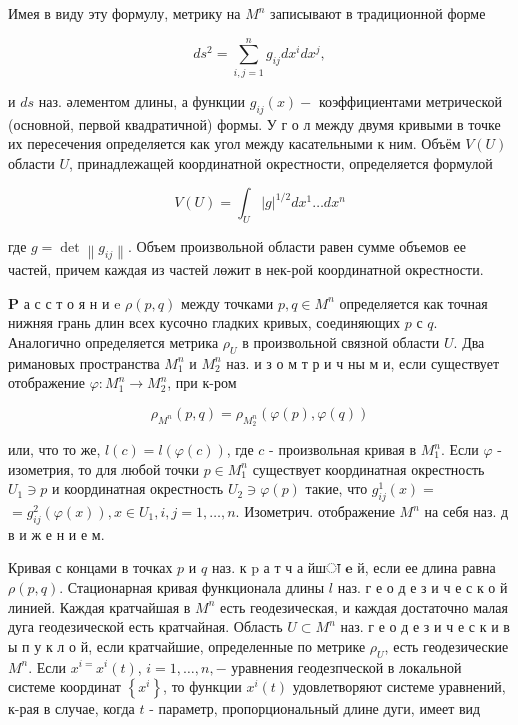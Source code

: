 \documentclass[10pt]{article}
\begin{document}
Имея в виду эту формулу, метрику на $M^{n}$ записывают в традиционной форме



\[

d s^{2}=\sum_{i, j=1}^{n} g_{i j} d x^{i} d x^{j},

\]



и $d s$ наз. әлементом длины, а функции $g_{i j}(x)-$ коэффициентами метрической (основной, первой квадратичной) формы. У г о л между двумя кривыми в точке их пересечения определяется как угол между касательными к ним. Объём $V(U)$ области $U$, принадлежащей координатной окрестности, определяется формулой



\[

V(U)=\int_{U}|g|^{1 / 2} d x^{1} \ldots d x^{n}

\]



где $g=\operatorname{det}\left\|g_{i j}\right\|$. Объем произвольной области равен сумме объемов ее частей, причем каждая из частей лөжит в нек-рой координатной окрестности.



$\mathbf{P}$ а с с т о я н и e $\rho(p, q)$ между точками $p, q \in M^{n}$ определяется как точная нижняя грань длин всех кусочно гладких кривых, соединяющих $p$ с $q$. Аналогично определяется метрика $\rho_{U}$ в произвольной связной области $U$. Два римановых пространства $M_{1}^{n}$ и $M_{2}^{n}$ наз. и з о м т р и ч ны м и, если существует отображение $\varphi: M_{1}^{n} \rightarrow M_{2}^{n}$, при к-ром



\[

\rho_{M^{n}}(p, q)=\rho_{M_{2}^{n}}(\varphi(p), \varphi(q))

\]



или, что то же, $l(c)=l(\varphi(c))$, где $c$ - произвольная кривая в $M_{1}^{n}$. Если $\varphi$ - изометрия, то для любой точки $p \in M_{1}^{n}$ существует координатная окрестность $U_{1} \ni p$ и координатная окрестность $U_{2} \ni \varphi(p)$ такие, что $g_{i j}^{1}(x)=$ $=g_{i j}^{2}(\varphi(x)), x \in U_{1}, i, j=1, \ldots, n$. Изометрич. отображение $M^{n}$ на себя наз. д в и ж е н и е м.



Кривая с концами в точках $p$ и $q$ наз. к $\mathrm{p}$ а т ч а йшा $\mathbf{e}$ й, если ее длина равна $\rho(p, q)$. Стационарная кривая функционала длины $l$ наз. г е о д е з и ч е с к о й линией. Каждая кратчайшая в $M^{n}$ есть геодезическая, и каждая достаточно малая дуга геодезической есть кратчайная. Область $U \subset M^{n}$ наз. г е о д е з и ч е с к и в ы п у к л о й, если кратчайшие, определенные по метрике $\rho_{U}$, есть геодезические $M^{n}$. Если $x^{i=} x^{i}(t)$, $i=1, \ldots, n,-$ уравнения геодезпческой в локальной системе координат $\left\{x^{i}\right\}$, то функции $x^{i}(t)$ удовлетворяют системе уравнений, к-рая в случае, когда $t$ - параметр, пропорциональный длине дуги, имеет вид
\end{document}
